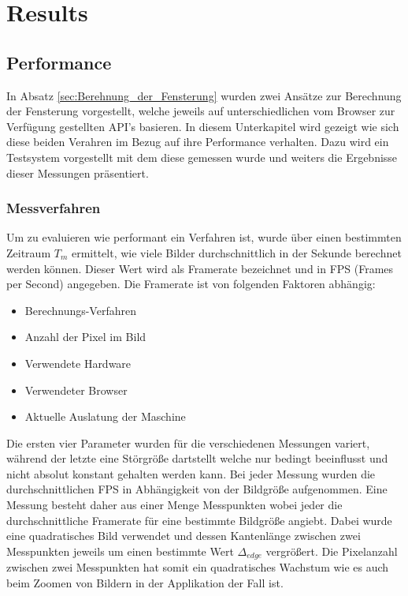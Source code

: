 
\section{Results}
\label{sec:results}

\subsection{Performance}
\label{sec:Performance}

In Absatz \ref{sec:Berehnung_der_Fensterung} wurden zwei Ansätze zur Berechnung der Fensterung vorgestellt,
welche jeweils auf unterschiedlichen vom Browser zur Verfügung gestellten API's basieren.
In diesem Unterkapitel wird gezeigt wie sich diese beiden Verahren im Bezug auf ihre Performance verhalten.
Dazu wird ein Testsystem vorgestellt mit dem diese gemessen wurde und weiters die Ergebnisse dieser Messungen präsentiert.

\subsubsection{Messverfahren}
Um zu evaluieren wie performant ein Verfahren ist,
wurde über einen bestimmten Zeitraum $T_m$ ermittelt, wie viele Bilder durchschnittlich in der Sekunde berechnet werden können.
Dieser Wert wird als Framerate bezeichnet und in FPS (Frames per Second) angegeben.
Die Framerate ist von folgenden Faktoren abhängig:
\begin{itemize}
	\item Berechnungs-Verfahren
	\item Anzahl der Pixel im Bild
	\item Verwendete Hardware
	\item Verwendeter Browser
	\item Aktuelle Auslatung der Maschine
\end{itemize}
Die ersten vier Parameter wurden für die verschiedenen Messungen variert, während der letzte eine Störgröße dartstellt welche nur bedingt beeinflusst und nicht absolut konstant gehalten werden kann.
Bei jeder Messung wurden die durchschnittlichen FPS in Abhängigkeit von der Bildgröße aufgenommen.
Eine Messung besteht daher aus einer Menge Messpunkten wobei jeder die durchschnittliche Framerate für eine bestimmte Bildgröße angiebt.
Dabei wurde eine quadratisches Bild verwendet und dessen Kantenlänge zwischen zwei Messpunkten jeweils um einen bestimmte Wert $\Delta_{edge}$ vergrößert.
Die Pixelanzahl zwischen zwei Messpunkten hat somit ein quadratisches Wachstum wie es auch beim Zoomen von Bildern in der Applikation der Fall ist.

